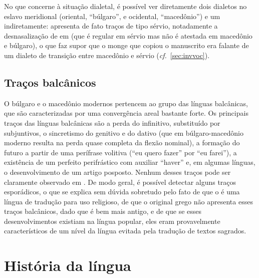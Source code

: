 

No que concerne à situação dialetal, é possível ver diretamente dois dialetos no
eslavo meridional (oriental, ``búlgaro'', e ocidental, ``macedônio'') e um
indiretamente:  apresenta de fato traços de tipo sérvio,
notadamente a desnasalização de  em  (que é regular em sérvio
mas não é atestada em macedônio e búlgaro), o que faz supor que o monge que
copiou o manuscrito era falante de um dialeto de transição entre macedônio e
sérvio (\emph{cf.}~\ref{sec:invvoc}).

\subsection{Traços balcânicos}
O búlgaro e o macedônio modernos pertencem ao grupo das línguas balcânicas, que
são caracterizadas por uma convergência areal bastante forte.
Os principais traços das línguas balcânicas são a perda do infinitivo,
substituído por subjuntivos, o sincretismo do genitivo e do dativo (que em
búlgaro-macedônio moderno resulta na perda quase completa da flexão nominal), a
formação do futuro a partir de uma perífrase volitiva (``eu quero fazer'' por
``eu farei''), a existência de um perfeito perifrástico com auxiliar ``haver''
e, em algumas línguas, o desenvolvimento de um artigo posposto.
Nenhum desses traços pode ser claramente observado em .
De modo geral, é possível detectar alguns traços esporádicos, o que se explica
sem dúvida sobretudo pelo fato de que o  é uma língua de tradução
para uso religioso, de que o original grego não apresenta esses traços
balcânicos, dado que é bem mais antigo, e de que se esses desenvolvimentos
existiam na língua popular, eles eram provavelmente característicos de um nível
da língua evitada pela tradução de textos sagrados.

\section{História da língua}


